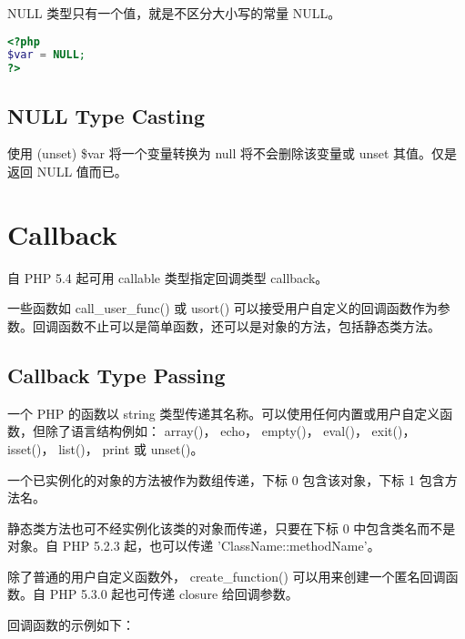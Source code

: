 NULL 类型只有一个值，就是不区分大小写的常量 NULL。

\begin{lstlisting}[language=PHP]
<?php
$var = NULL;       
?>
\end{lstlisting}

\subsection{NULL Type Casting}

使用 (unset) \$var 将一个变量转换为 null 将不会删除该变量或 unset 其值。仅是返回 NULL 值而已。






\section{Callback}

自 PHP 5.4 起可用 callable 类型指定回调类型 callback。


一些函数如 call\_user\_func() 或 usort() 可以接受用户自定义的回调函数作为参数。回调函数不止可以是简单函数，还可以是对象的方法，包括静态类方法。


\subsection{Callback Type Passing}

一个 PHP 的函数以 string 类型传递其名称。可以使用任何内置或用户自定义函数，但除了语言结构例如： array()， echo， empty()， eval()， exit()， isset()， list()， print 或 unset()。

一个已实例化的对象的方法被作为数组传递，下标 0 包含该对象，下标 1 包含方法名。

静态类方法也可不经实例化该类的对象而传递，只要在下标 0 中包含类名而不是对象。自 PHP 5.2.3 起，也可以传递 'ClassName::methodName'。

除了普通的用户自定义函数外， create\_function() 可以用来创建一个匿名回调函数。自 PHP 5.3.0 起也可传递 closure 给回调参数。

回调函数的示例如下：

